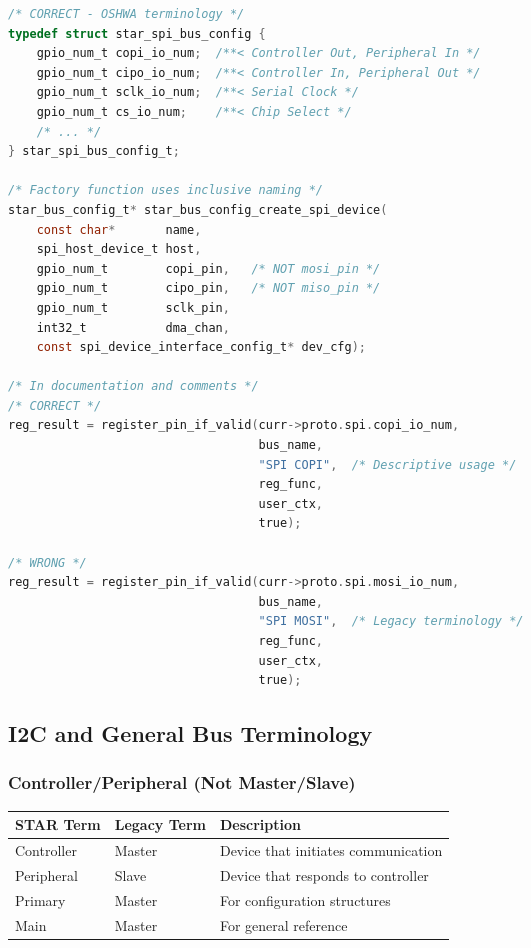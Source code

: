 \begin{lstlisting}[language=C]
/* CORRECT - OSHWA terminology */
typedef struct star_spi_bus_config {
    gpio_num_t copi_io_num;  /**< Controller Out, Peripheral In */
    gpio_num_t cipo_io_num;  /**< Controller In, Peripheral Out */
    gpio_num_t sclk_io_num;  /**< Serial Clock */
    gpio_num_t cs_io_num;    /**< Chip Select */
    /* ... */
} star_spi_bus_config_t;

/* Factory function uses inclusive naming */
star_bus_config_t* star_bus_config_create_spi_device(
    const char*       name,
    spi_host_device_t host,
    gpio_num_t        copi_pin,   /* NOT mosi_pin */
    gpio_num_t        cipo_pin,   /* NOT miso_pin */
    gpio_num_t        sclk_pin,
    int32_t           dma_chan,
    const spi_device_interface_config_t* dev_cfg);

/* In documentation and comments */
/* CORRECT */
reg_result = register_pin_if_valid(curr->proto.spi.copi_io_num,
                                   bus_name,
                                   "SPI COPI",  /* Descriptive usage */
                                   reg_func,
                                   user_ctx,
                                   true);

/* WRONG */
reg_result = register_pin_if_valid(curr->proto.spi.mosi_io_num,
                                   bus_name,
                                   "SPI MOSI",  /* Legacy terminology */
                                   reg_func,
                                   user_ctx,
                                   true);
\end{lstlisting}

\subsection{I2C and General Bus Terminology}

\subsubsection{Controller/Peripheral (Not Master/Slave)}

\begin{center}
\begin{tabular}{|l|l|l|}
\hline
\textbf{STAR Term} & \textbf{Legacy Term} & \textbf{Description} \\
\hline
Controller & Master & Device that initiates communication \\
\hline
Peripheral & Slave & Device that responds to controller \\
\hline
Primary & Master & For configuration structures \\
\hline
Main & Master & For general reference \\
\hline
\end{tabular}
\end{center}

